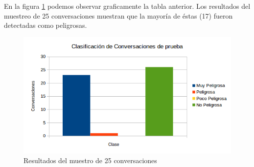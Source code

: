 En la figura \ref{fig:ClasificacionConv} podemos observar graficamente la tabla anterior. Los resultados del muestreo de 25 conversaciones muestran que la mayor\'ia de \'estas (17) fueron detectadas como peligrosas.

\begin{figure}[h]
\begin{center}
\includegraphics[scale=.3]{images/grafica/ClasificacionConv}
\caption{Resultados del muestro de 25 conversaciones}
\label{fig:ClasificacionConv}
\end{center}
\end{figure}


